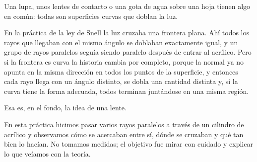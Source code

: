 Una lupa, unos lentes de contacto o una gota de agua sobre una hoja tienen algo en común: todas son superficies curvas que doblan la luz.

En la práctica de la ley de Snell la luz cruzaba una frontera plana. Ahí todos los rayos que llegaban con el mismo ángulo se doblaban exactamente igual, y un grupo de rayos paralelos seguía siendo paralelo después de entrar al acrílico. Pero si la frontera es curva la historia cambia por completo, porque la normal ya no apunta en la misma dirección en todos los puntos de la superficie, y entonces cada rayo llega con un ángulo distinto, se dobla una cantidad distinta y, si la curva tiene la forma adecuada, todos terminan juntándose en una misma región.

Esa es, en el fondo, la idea de una lente.

En esta práctica hicimos pasar varios rayos paralelos a través de un cilindro de acrílico y observamos cómo se acercaban entre sí, dónde se cruzaban y qué tan bien lo hacían. No tomamos medidas; el objetivo fue mirar con cuidado y explicar lo que veíamos con la teoría.
